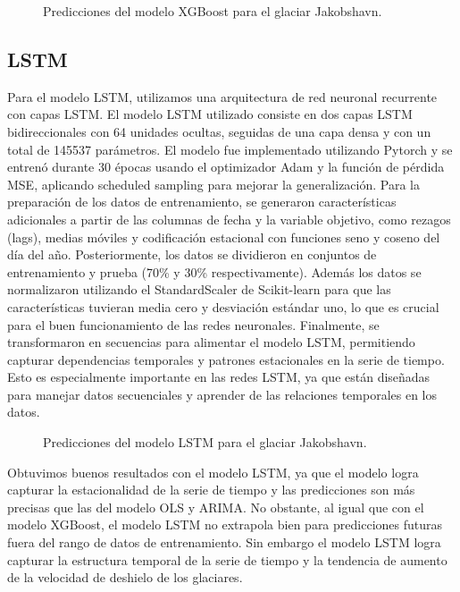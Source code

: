 \documentclass[sigconf,authordraft,language=spanish]{acmart}
\begin{document}
\begin{figure}[htbp]
   \centering
   
    \caption{Predicciones del modelo XGBoost para el glaciar Jakobshavn.}
    \label{fig:jakobshavn_xgb}
\end{figure}


\subsection{LSTM}

Para el modelo LSTM, utilizamos una arquitectura de red neuronal recurrente con capas LSTM.
El modelo LSTM utilizado consiste en dos capas LSTM bidireccionales con 64 unidades ocultas, seguidas de una capa densa y con un total de 145537 parámetros. 
El modelo fue implementado utilizando Pytorch \cite{Ansel_PyTorch_2_Faster_2024} y se entrenó durante 30 épocas usando el optimizador Adam y la función de pérdida MSE, aplicando scheduled sampling para mejorar la generalización.
Para la preparación de los datos de entrenamiento, se generaron características adicionales a partir de las columnas de fecha y la variable objetivo, como rezagos (lags), medias móviles y codificación estacional con funciones seno y coseno del día del año. Posteriormente, los datos se dividieron en conjuntos de entrenamiento y prueba (70\% y 30\% respectivamente).
Además los datos se normalizaron utilizando el StandardScaler de Scikit-learn para que las características tuvieran media cero y desviación estándar uno, lo que es crucial para el buen funcionamiento de las redes neuronales.
Finalmente, se transformaron en secuencias para alimentar el modelo LSTM, permitiendo capturar dependencias temporales y patrones estacionales en la serie de tiempo.
Esto es especialmente importante en las redes LSTM, ya que están diseñadas para manejar datos secuenciales y aprender de las relaciones temporales en los datos.


\begin{figure}[htbp]
   \centering
   
    \caption{Predicciones del modelo LSTM para el glaciar Jakobshavn.}
    \label{fig:jakobshavn_lstm}
\end{figure}

Obtuvimos buenos resultados con el modelo LSTM, ya que el modelo logra capturar la estacionalidad de la serie de tiempo y las predicciones son más precisas que las del modelo OLS y ARIMA.
No obstante, al igual que con el modelo XGBoost, el modelo LSTM no extrapola bien para predicciones futuras fuera del rango de datos de entrenamiento. 
Sin embargo el modelo LSTM logra capturar la estructura temporal de la serie de tiempo y la tendencia de aumento 
de la velocidad de deshielo de los glaciares.
\end{document}
